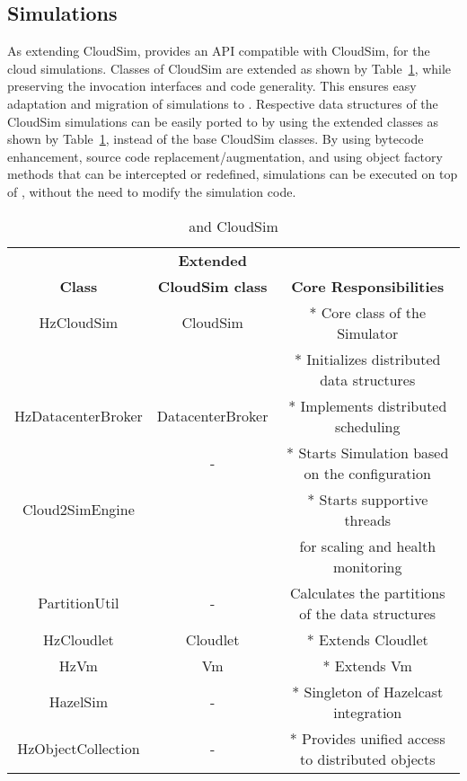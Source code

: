 \subsection{ Simulations}
As extending CloudSim,  provides an API compatible with CloudSim, for the cloud simulations. Classes of CloudSim are extended as shown by Table~\ref{table:inheritance}, while preserving the invocation interfaces and code generality. This ensures easy adaptation and migration of  simulations to . Respective data structures of the CloudSim simulations can be easily ported to  by using the extended classes as shown by Table~\ref{table:inheritance}, instead of the base CloudSim classes. By using bytecode enhancement, source code replacement/augmentation, and using object factory methods that can be intercepted or redefined,  simulations can be executed on top of , without the need to modify the simulation code.

\begin{table}[!t]
\caption{ and CloudSim}
\label{table:inheritance}
\begin{tabular}{|c||c| |c|}
\hline
 & \textbf{Extended} & \\
\textbf{ Class} &\textbf{CloudSim class} & \textbf{Core Responsibilities}\\
\hline
HzCloudSim & CloudSim & * Core class of the Simulator\\
& & * Initializes distributed data structures \\
\hline
HzDatacenterBroker & DatacenterBroker & * Implements distributed scheduling\\
\hline
 & - & * Starts Simulation based on the configuration \\
Cloud2SimEngine & & * Starts supportive threads \\
& & for scaling and health monitoring\\
\hline
PartitionUtil & - & Calculates the partitions of the data structures\\
\hline
HzCloudlet & Cloudlet & * Extends Cloudlet\\
\hline
HzVm & Vm & * Extends Vm\\
\hline
HazelSim & - & * Singleton of Hazelcast integration\\
\hline
HzObjectCollection & - & * Provides unified access to distributed objects\\
\hline
\end{tabular}
\end{table}

